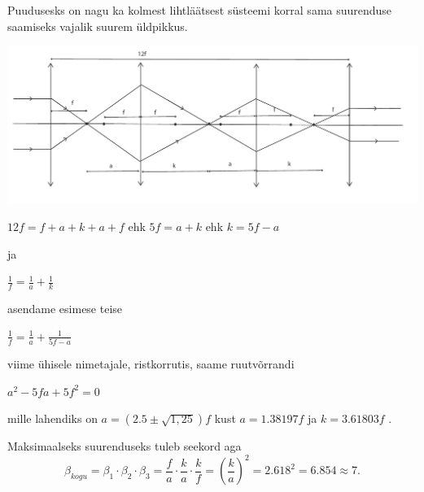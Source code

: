 \documentclass[12pt,a5paper]{article}
\begin{document}
Puudusesks on nagu ka kolmest lihtläätsest süsteemi korral sama suurenduse saamiseks vajalik suurem üldpikkus.

\vspace{-10pt}
  \begin{center}
    \includegraphics[width=1\textwidth]{laatsed_lah5}
  \end{center}
  \vspace{-10pt}


$ 12f = f + a + k + a + f $ ehk $ 5f = a + k $ ehk $ k = 5f - a $

ja

$ \frac {1}{f} = \frac{1}{a} + \frac{1}{k} $

asendame esimese teise

$ \frac{1}{f} = \frac {1}{a} + \frac{1}{5f - a} $

viime ühisele nimetajale, ristkorrutis, saame ruutvõrrandi

$ a^2 - 5fa + 5f^2 =0 $

mille lahendiks on $ a = (2.5 \pm \sqrt{1,25}) f $ kust $a=1.38197f $ ja $k=3.61803f$ .

Maksimaalseks suurenduseks tuleb seekord aga  
\[ {\beta}_{kogu} = {\beta}_1 \cdot {\beta}_2 \cdot {\beta}_3 = \frac {f}{a} \cdot \frac {k}{a} \cdot \frac {k}{f} = {(\frac {k}{a})}^2 = 2.618^2 = 6.854 \approx 7. \]
\end{document}
